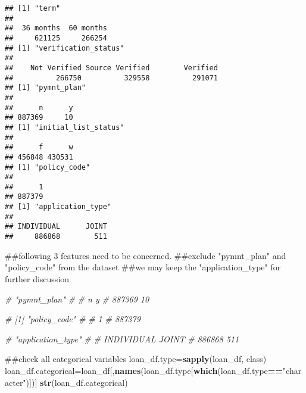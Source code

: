 \documentclass[]{article}
\newenvironment{Shaded}{\begin{snugshade}}{\end{snugshade}}
\newcommand{\KeywordTok}[1]{\textcolor[rgb]{0.13,0.29,0.53}{\textbf{#1}}}
\newcommand{\StringTok}[1]{\textcolor[rgb]{0.31,0.60,0.02}{#1}}
\newcommand{\CommentTok}[1]{\textcolor[rgb]{0.56,0.35,0.01}{\textit{#1}}}
\newcommand{\OperatorTok}[1]{\textcolor[rgb]{0.81,0.36,0.00}{\textbf{#1}}}
\newcommand{\NormalTok}[1]{#1}
\begin{document}
\begin{verbatim}
## [1] "term"
## 
##  36 months  60 months 
##     621125     266254 
## [1] "verification_status"
## 
##    Not Verified Source Verified        Verified 
##          266750          329558          291071 
## [1] "pymnt_plan"
## 
##      n      y 
## 887369     10 
## [1] "initial_list_status"
## 
##      f      w 
## 456848 430531 
## [1] "policy_code"
## 
##      1 
## 887379 
## [1] "application_type"
## 
## INDIVIDUAL      JOINT 
##     886868        511
\end{verbatim}

\begin{Shaded}
\begin{Highlighting}[]
\NormalTok{##following 3 features need to be concerned.}
\NormalTok{##exclude "pymnt_plan" and "policy_code" from the dataset}
\NormalTok{##we may keep the "application_type" for further discussion}

\CommentTok{# "pymnt_plan"}
\CommentTok{# }
\CommentTok{#      n      y }
\CommentTok{# 887369     10 }

\CommentTok{# [1] "policy_code"}
\CommentTok{# }
\CommentTok{#      1 }
\CommentTok{# 887379 }

\CommentTok{# "application_type"}
\CommentTok{# }
\CommentTok{# INDIVIDUAL      JOINT }
\CommentTok{#     886868        511 }


\NormalTok{##check all categorical variables}
\NormalTok{loan_df.type=}\KeywordTok{sapply}\NormalTok{(loan_df, class)}
\NormalTok{loan_df.categorical=loan_df[,}\KeywordTok{names}\NormalTok{(loan_df.type[}\KeywordTok{which}\NormalTok{(loan_df.type}\OperatorTok{==}\StringTok{"character"}\NormalTok{)])]}
\KeywordTok{str}\NormalTok{(loan_df.categorical)}
\end{Highlighting}
\end{Shaded}
\end{document}
